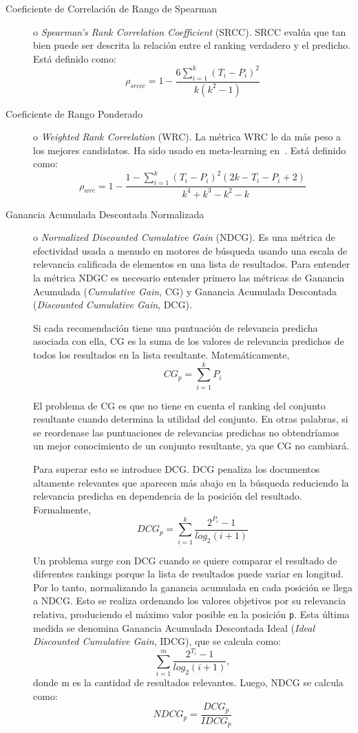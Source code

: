 \begin{description}
	\item[Coeficiente de Correlación de Rango de Spearman]o \textit{Spearman’s Rank Correlation Coefficient} (SRCC). SRCC evalúa que tan  bien puede ser descrita la relación entre el ranking verdadero y el predicho. Está definido como: $$\rho_{srccc} = 1 - \dfrac{6\sum^k_{i=1}(T_i - P_i)^2}{k(k^2-1)}$$
	
	\item[Coeficiente de Rango Ponderado]o \textit{Weighted Rank Correlation} (WRC). La métrica WRC le da más peso a los mejores candidatos. Ha sido usado en meta-learning en~\cite{sun2014MetaLearningAT, soares2004learning, costa2005weighted}. Está definido como: $$\rho_{wrc} = 1 - \dfrac{1-\sum^k_{i=1} (T_i - P_i)^2(2k - T_i - P_i + 2) }{k ^4+k^3-k^2-k}$$
	
	\item[Ganancia Acumulada Descontada Normalizada]o \textit{Normalized Discounted Cumulative Gain} (NDCG). Es una métrica de efectividad usada a menudo en motores de búsqueda usando una escala de relevancia calificada de elementos en una lista de resultados. Para entender la métrica NDGC es necesario entender primero las métricas de Ganancia Acumulada (\textit{Cumulative Gain}, CG) y Ganancia Acumulada Descontada (\textit{Discounted Cumulative Gain}, DCG).
	
	Si cada recomendación tiene una puntuación de relevancia predicha asociada con ella, CG es la suma de los valores de relevancia predichos de todos los resultados en la lista resultante. Matemáticamente, $$CG_p = \sum^k_{i=1}P_i$$
	
	El problema de CG es que no tiene en cuenta el ranking del conjunto resultante cuando determina la utilidad del conjunto. En otras palabras, si se reordenase las puntuaciones de relevancias predichas no obtendríamos un mejor conocimiento de un conjunto resultante, ya que CG no cambiará.
	
	Para superar esto se introduce DCG. DCG penaliza los documentos altamente relevantes que aparecen más abajo en la búsqueda reduciendo la relevancia predicha en dependencia de la posición del resultado. Formalmente, $$DCG_p = \sum^k_{i=1} \dfrac{2^{P_i} - 1}{log_2(i + 1)}$$
	
	Un problema surge con DCG cuando se quiere comparar el resultado de diferentes rankings porque la lista de resultados puede variar en longitud. Por lo tanto, normalizando la ganancia acumulada en cada posición se llega a NDCG. Esto se realiza ordenando los valores objetivos por su relevancia relativa, produciendo el máximo valor posible en la posición \texttt{p}. Esta última medida se denomina Ganancia Acumulada Descontada Ideal (\textit{Ideal Discounted Cumulative Gain}, IDCG), que se calcula como: $$\sum^m_{i=1} \dfrac{2^{T_i} - 1}{log_2(i+1)}, $$ donde m es la cantidad de resultados relevantes.
	Luego, NDCG se calcula como: $$NDCG_p = \frac{DCG_p}{IDCG_p}$$
\end{description}

